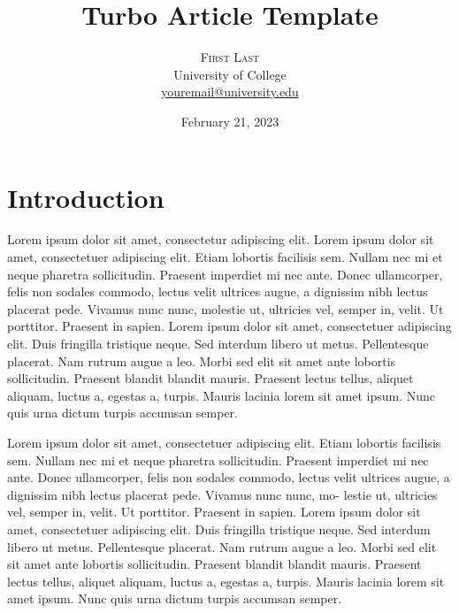 \documentclass[
  9pt,
  twocolumn,
  twoside]{turbo}%
\title{Turbo Article Template}
\author{
\textsc{First Last}
\\[1ex]
\normalsize University of College
\\
\normalsize\href{mailto:youremail@university.edu}{youremail@university.edu}
}
\date{February 21, 2023}
\begin{document}
\renewcommand{\maketitlehookd}{%
\begin{abstract}
\noindent{}Lorem ipsum dolor sit amet, consectetuer adipiscing elit.
Etiam lobortis facilisis sem. Nullam nec mi et neque pharetra
sollicitudin. Praesent imperdiet mi nec ante. Donec ullamcorper, felis
non sodales com- modo, lectus velit ultrices augue, a dignissim nibh
lectus placerat pede. Vivamus nunc nunc, molestie ut, ultricies vel,
semper in, velit. Ut porttitor. Praesent in sapien. Lorem ipsum dolor
sit amet, consectetuer adipiscing elit. This is the abstract.
\end{abstract}
}

\maketitle

\ifdefined\Shaded\renewenvironment{Shaded}{\begin{tcolorbox}[borderline west={3pt}{0pt}{shadecolor}, boxrule=0pt, sharp corners, frame hidden, interior hidden, enhanced, breakable]}{\end{tcolorbox}}\fi




\hypertarget{sec-intro}{%
\section{Introduction}\label{sec-intro}}

Lorem ipsum dolor sit amet, consectetur adipiscing elit. Lorem ipsum
dolor sit amet, consectetuer adipiscing elit. Etiam lobortis facilisis
sem. Nullam nec mi et neque pharetra sollicitudin. Praesent imperdiet mi
nec ante. Donec ullamcorper, felis non sodales commodo, lectus velit
ultrices augue, a dignissim nibh lectus placerat pede. Vivamus nunc
nunc, molestie ut, ultricies vel, semper in, velit. Ut porttitor.
Praesent in sapien. Lorem ipsum dolor sit amet, consectetuer adipiscing
elit. Duis fringilla tristique neque. Sed interdum libero ut metus.
Pellentesque placerat. Nam rutrum augue a leo. Morbi sed elit sit amet
ante lobortis sollicitudin. Praesent blandit blandit mauris. Praesent
lectus tellus, aliquet aliquam, luctus a, egestas a, turpis. Mauris
lacinia lorem sit amet ipsum. Nunc quis urna dictum turpis accumsan
semper.

Lorem ipsum dolor sit amet, consectetuer adipiscing elit. Etiam lobortis
facilisis sem. Nullam nec mi et neque pharetra sollicitudin. Praesent
imperdiet mi nec ante. Donec ullamcorper, felis non sodales commodo,
lectus velit ultrices augue, a dignissim nibh lectus placerat pede.
Vivamus nunc nunc, mo- lestie ut, ultricies vel, semper in, velit. Ut
porttitor. Praesent in sapien. Lorem ipsum dolor sit amet, consectetuer
adipiscing elit. Duis fringilla tristique neque. Sed interdum libero ut
metus. Pellentesque placerat. Nam rutrum augue a leo. Morbi sed elit sit
amet ante lobortis sollicitudin. Praesent blandit blandit mauris.
Praesent lectus tellus, aliquet aliquam, luctus a, egestas a, turpis.
Mauris lacinia lorem sit amet ipsum. Nunc quis urna dictum turpis
accumsan semper.
\end{document}
